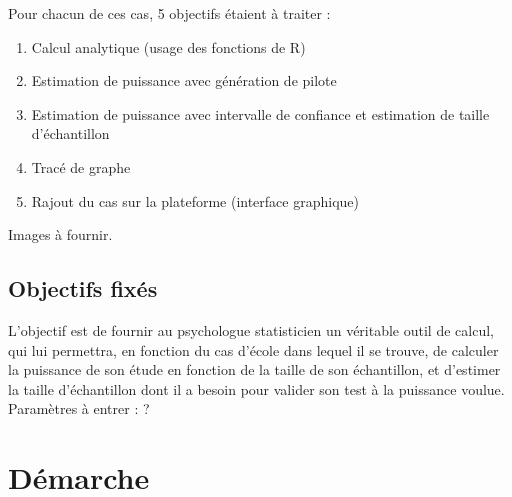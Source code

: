 \documentclass[a4paper,11pt]{article}
\begin{document}
Pour chacun de ces cas, 5 objectifs étaient à traiter : 
\begin{enumerate}
\item Calcul analytique (usage des fonctions de R)
\item Estimation de puissance avec génération de pilote
\item Estimation de puissance avec intervalle de confiance et estimation de taille d'échantillon
\item Tracé de graphe
\item Rajout du cas sur la plateforme (interface graphique)
\end{enumerate}
Images à fournir.
\subsection{Objectifs fixés}
L'objectif est de fournir au psychologue statisticien un véritable outil de calcul, qui lui permettra, en fonction du cas d'école dans lequel il se trouve, de calculer la puissance de son étude en fonction de la taille de son échantillon, et d'estimer la taille d'échantillon dont il a besoin pour valider son test à la puissance voulue.\\
Paramètres à entrer : ?
\section{Démarche}
\end{document}
